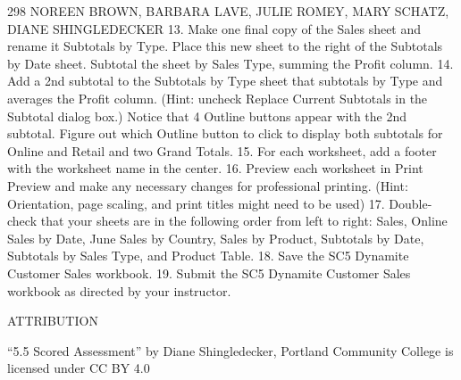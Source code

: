 298 NOREEN BROWN, BARBARA LAVE, JULIE ROMEY, MARY SCHATZ, DIANE SHINGLEDECKER
13. Make one final copy of the Sales sheet and rename it Subtotals by Type. Place this new sheet to
the right of the Subtotals by Date sheet. Subtotal the sheet by Sales Type, summing the Profit
column.
14. Add a 2nd subtotal to the Subtotals by Type sheet that subtotals by Type and averages the Profit
column. (Hint: uncheck Replace Current Subtotals in the Subtotal dialog box.) Notice that 4
Outline buttons appear with the 2nd subtotal. Figure out which Outline button to click to
display both subtotals for Online and Retail and two Grand Totals.
15. For each worksheet, add a footer with the worksheet name in the center.
16. Preview each worksheet in Print Preview and make any necessary changes for professional
printing. (Hint: Orientation, page scaling, and print titles might need to be used)
17. Double-check that your sheets are in the following order from left to right: Sales, Online Sales
by Date, June Sales by Country, Sales by Product, Subtotals by Date, Subtotals by Sales Type,
and Product Table.
18. Save the SC5 Dynamite Customer Sales workbook.
19. Submit the SC5 Dynamite Customer Sales workbook as directed by your instructor.

ATTRIBUTION

“5.5 Scored Assessment” by Diane Shingledecker, Portland Community College is licensed under CC
BY 4.0

